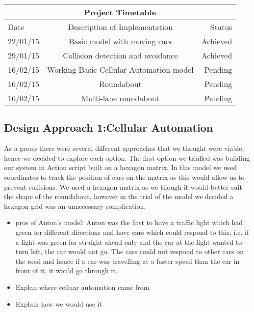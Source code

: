 \documentclass[11pt]{article}
\begin{document}
	
	\begin{tabular}{ | l | c | r | }
		\hline
		\multicolumn{3}{|c|}{Project Timetable}  \\ \hline
		Date & Description of Implementation & Status \\ \hline
		22/01/15 & Basic model with moving cars &  Achieved \\ \hline
		29/01/15 & Collision detection and avoidance & Achieved \\ \hline
		16/02/15 & Working Basic Cellular Automation model & Pending \\ \hline
		16/02/15 & Roundabout & Pending \\ \hline
		16/02/15 & Multi-lane roundabout & Pending \\ \hline
		
	\end{tabular}
	\subsection{Design Approach 1:Cellular Automation}
	As a group there were several different approaches that we thought were viable, hence we decided to explore each option.
	The first option we trialled was building our system in Action script built on a hexagon matrix. In this model we used coordinates to track the position of cars on the matrix as this would allow us to prevent collisions. We used a hexagon matrix as we though it would better suit the shape of the roundabout, however in the trial of the model we decided a hexagon grid was an unnecessary complication. 
	
	\begin{itemize}

		\item pros of Anton's model: Anton was the first to have a traffic light which had green for different directions and have cars which could respond to this, i.e. if a light was green for straight ahead only and the car at the light wanted to turn left, the car would not go. The cars could not respond to other cars on the road and hence if a car was travelling at a faster speed than the car in front of it, it would go through it. 
	\end{itemize}
	
	
	\begin{itemize}
		\item Explan where celluar automation came from
		\item Explain how we would use it
	\end{itemize}
\end{document}
